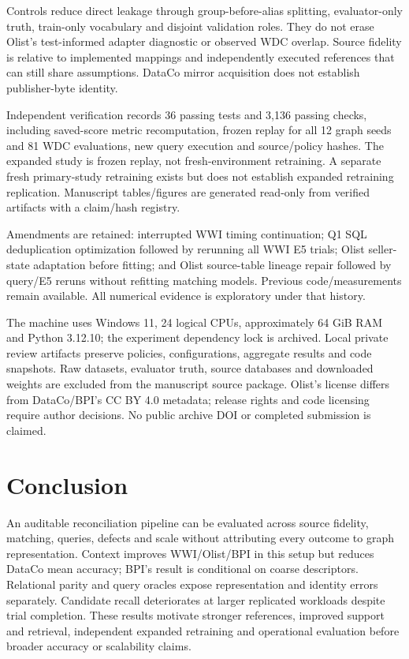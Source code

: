 \documentclass[conference,letterpaper]{IEEEtran}
\begin{document}
Controls reduce direct leakage through group-before-alias splitting, evaluator-only truth, train-only vocabulary and disjoint validation roles. They do not erase Olist's test-informed adapter diagnostic or observed WDC overlap. Source fidelity is relative to implemented mappings and independently executed references that can still share assumptions. DataCo mirror acquisition does not establish publisher-byte identity.

Independent verification records 36 passing tests and 3,136 passing checks, including saved-score metric recomputation, frozen replay for all 12 graph seeds and 81 WDC evaluations, new query execution and source/policy hashes. The expanded study is frozen replay, not fresh-environment retraining. A separate fresh primary-study retraining exists but does not establish expanded retraining replication. Manuscript tables/figures are generated read-only from verified artifacts with a claim/hash registry.

Amendments are retained: interrupted WWI timing continuation; Q1 SQL deduplication optimization followed by rerunning all WWI E5 trials; Olist seller-state adaptation before fitting; and Olist source-table lineage repair followed by query/E5 reruns without refitting matching models. Previous code/measurements remain available. All numerical evidence is exploratory under that history.

The machine uses Windows 11, 24 logical CPUs, approximately 64 GiB RAM and Python 3.12.10; the experiment dependency lock is archived. Local private review artifacts preserve policies, configurations, aggregate results and code snapshots. Raw datasets, evaluator truth, source databases and downloaded weights are excluded from the manuscript source package. Olist's license differs from DataCo/BPI's CC BY 4.0 metadata; release rights and code licensing require author decisions. No public archive DOI or completed submission is claimed.

\section{Conclusion}
An auditable reconciliation pipeline can be evaluated across source fidelity, matching, queries, defects and scale without attributing every outcome to graph representation. Context improves WWI/Olist/BPI in this setup but reduces DataCo mean accuracy; BPI's result is conditional on coarse descriptors. Relational parity and query oracles expose representation and identity errors separately. Candidate recall deteriorates at larger replicated workloads despite trial completion. These results motivate stronger references, improved support and retrieval, independent expanded retraining and operational evaluation before broader accuracy or scalability claims.
\end{document}

